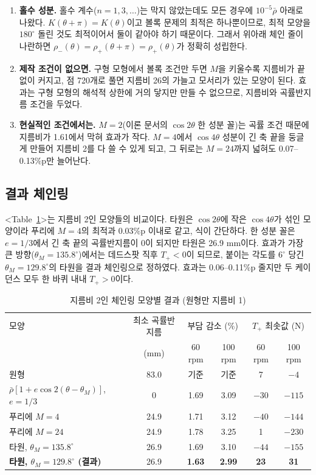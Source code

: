 \begin{enumerate}
\item \textbf{홀수 성분.} 홀수 계수(\(n=1,3,\dots\))는 막지 않았는데도 모든 경우에 \(10^{-5}\bar\rho\) 아래로 나왔다. \(K(\theta+\pi)=K(\theta)\)이고 볼록 문제의 최적은 하나뿐이므로, 최적 모양을 \(180^\circ\) 돌린 것도 최적이어서 둘이 같아야 하기 때문이다. 그래서 위아래 체인 줄이 나란하면 \(\rho_-(\theta)=\rho_+(\theta+\pi)=\rho_+(\theta)\)가 정확히 성립한다.
\item \textbf{제작 조건이 없으면.} 구형 모형에서 볼록 조건만 두면 \(M\)을 키울수록 지름비가 끝없이 커지고, 점 720개로 풀면 지름비 26의 가늘고 모서리가 있는 모양이 된다. 효과는 구형 모형의 해석적 상한에 거의 닿지만 만들 수 없으므로, 지름비와 곡률반지름 조건을 두었다.
\item \textbf{현실적인 조건에서는.} \(M=2\)(이론 문서의 \(\cos2\theta\) 한 성분 꼴)는 곡률 조건 때문에 지름비가 1.61에서 막혀 효과가 작다. \(M=4\)에서 \(\cos4\theta\) 성분이 긴 축 끝을 둥글게 만들어 지름비 2를 다 쓸 수 있게 되고, 그 뒤로는 \(M=24\)까지 넓혀도 0.07--0.13\%p만 늘어난다.
\end{enumerate}

\subsection{결과 체인링}
<Table~\ref{tab:result}>는 지름비 2인 모양들의 비교이다. 타원은 \(\cos2\theta\)에 작은 \(\cos4\theta\)가 섞인 모양이라 푸리에 \(M=4\)의 최적과 0.03\%p 이내로 같고, 식이 간단하다. 한 성분 꼴은 \(e=1/3\)에서 긴 축 끝의 곡률반지름이 0이 되지만 타원은 26.9 mm이다. 효과가 가장 큰 방향(\(\theta_M=135.8^\circ\))에서는 데드스팟 직후 \(T_+<0\)이 되므로, 붙이는 각도를 \(6^\circ\) 당긴 \(\theta_M=129.8^\circ\)의 타원을 결과 체인링으로 정하였다. 효과는 0.06--0.11\%p 줄지만 두 케이던스 모두 한 바퀴 내내 \(T_+>0\)이다.

\begin{table}[!htb]
\centering\small\renewcommand{\arraystretch}{1.0}
\begin{tabular}{@{}lccccc@{}}
\toprule
모양 & 최소 곡률반지름 & \multicolumn{2}{c}{부담 감소 (\%)} & \multicolumn{2}{c}{\(T_+\) 최솟값 (N)}\\
 & (mm) & 60 rpm & 100 rpm & 60 rpm & 100 rpm\\\midrule
원형 & 83.0 & 기준 & 기준 & 7 & \(-4\)\\
\(\bar\rho[1+e\cos2(\theta-\theta_M)]\), \(e=1/3\) & 0 & 1.69 & 3.09 & \(-30\) & \(-115\)\\
푸리에 \(M=4\) & 24.9 & 1.71 & 3.12 & \(-40\) & \(-144\)\\
푸리에 \(M=24\) & 24.9 & 1.78 & 3.25 & 1 & \(-230\)\\
타원, \(\theta_M=135.8^\circ\) & 26.9 & 1.69 & 3.10 & \(-44\) & \(-155\)\\
\textbf{타원, \(\theta_M=129.8^\circ\) (결과)} & 26.9 & \textbf{1.63} & \textbf{2.99} & \textbf{23} & \textbf{31}\\
\bottomrule
\end{tabular}
\caption{지름비 2인 체인링 모양별 결과 (원형만 지름비 1)}
\label{tab:result}
\end{table}

